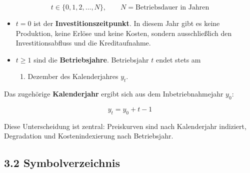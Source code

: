 \documentclass[
  a4paper,
  10pt]{article}
\providecommand{\tightlist}{%
  \setlength{\itemsep}{0pt}\setlength{\parskip}{0pt}}
\begin{document}
\[ t \in \{0, 1, 2, \dots, N\}, \qquad N = \text{Betriebsdauer in Jahren} \]

\begin{itemize}
\tightlist
\item
  \(t = 0\) ist der \textbf{Investitionszeitpunkt}. In diesem Jahr gibt
  es keine Produktion, keine Erlöse und keine Kosten, sondern
  ausschließlich den Investitionsabfluss und die Kreditaufnahme.
\item
  \(t \geq 1\) sind die \textbf{Betriebsjahre}. Betriebsjahr \(t\) endet
  stets am

  \begin{enumerate}
  \def\labelenumi{\arabic{enumi}.}
  \setcounter{enumi}{30}
  \tightlist
  \item
    Dezember des Kalenderjahres \(y_t\).
  \end{enumerate}
\end{itemize}

Das zugehörige \textbf{Kalenderjahr} ergibt sich aus dem
Inbetriebnahmejahr \(y_0\):

\[ y_t = y_0 + t - 1 \]

Diese Unterscheidung ist zentral: Preiskurven sind nach Kalenderjahr
indiziert, Degradation und Kostenindexierung nach Betriebsjahr.

\hypertarget{symbolverzeichnis}{%
\subsection{3.2 Symbolverzeichnis}\label{symbolverzeichnis}}
\end{document}
